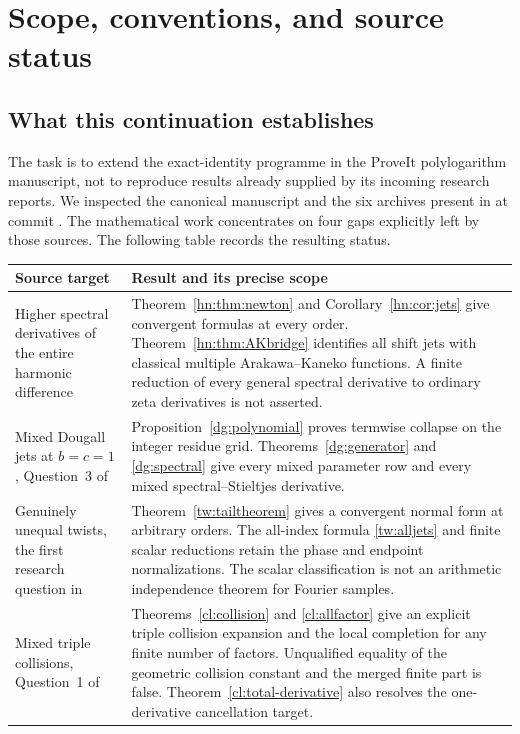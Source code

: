\section{Scope, conventions, and source status}
\label{scope:sec}

\subsection{What this continuation establishes}

The task is to extend the exact-identity programme in the ProveIt
polylogarithm manuscript, not to reproduce results already supplied
by its incoming research reports. We inspected the canonical
manuscript and the six archives present in 
at commit 
\cite{RepoMain,RepoEndpoint,RepoDougall,RepoTransport,RepoExact,
RepoCoincident,RepoTwisted}.
The mathematical work concentrates on four gaps explicitly left
by those sources. The following table records the resulting status.

\begin{longtable}{@{}>{\raggedright\arraybackslash}p{}>{\raggedright\arraybackslash}p{}@{}}
\toprule
Source target & Result and its precise scope\\
\midrule
\endhead
Higher spectral derivatives of the entire harmonic difference
\cite{RepoExact}
& Theorem~\ref{hn:thm:newton} and Corollary~\ref{hn:cor:jets}
give convergent formulas at every order. Theorem~\ref{hn:thm:AKbridge}
identifies all shift jets with classical multiple Arakawa--Kaneko
functions. A finite reduction of every general spectral derivative
to ordinary zeta derivatives is not asserted.\\[6pt]
Mixed Dougall jets at $b=c=1$, Question~3 of \cite{RepoTransport}
& Proposition~\ref{dg:polynomial} proves termwise collapse on the
integer residue grid. Theorems~\ref{dg:generator} and
\ref{dg:spectral} give every mixed parameter row and every
mixed spectral--Stieltjes derivative.\\[6pt]
Genuinely unequal twists, the first research question in \cite{RepoTwisted}
& Theorem~\ref{tw:tailtheorem} gives a convergent normal form at
arbitrary orders. The all-index formula \eqref{tw:alljets}
and finite scalar reductions retain the phase and endpoint
normalizations. The scalar classification is not an arithmetic
independence theorem for Fourier samples.\\[6pt]
Mixed triple collisions, Question~1 of \cite{RepoExact}
& Theorems~\ref{cl:collision} and \ref{cl:allfactor} give an
explicit triple collision expansion and the local completion for
any finite number of factors. Unqualified equality of the geometric
collision constant and the merged finite part is false. Theorem~\ref{cl:total-derivative} also resolves the one-derivative cancellation target.\\
\bottomrule
\end{longtable}

